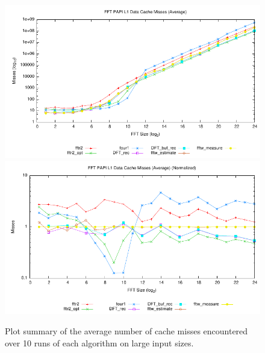 \documentclass[11 pt]{article}
\begin{document}
\begin{figure}[htbp]
  \centering
	\includegraphics[width=\columnwidth]{../plots/l1dcm_ave}
	\includegraphics[width=\columnwidth]{../plots/l1dcm_ave_norm}
  \caption{Plot summary of the average number of cache misses encountered over
		10 runs of each algorithm on large input sizes.}
  \label{fig:cache_misses_ave}
\end{figure}
\end{document}

